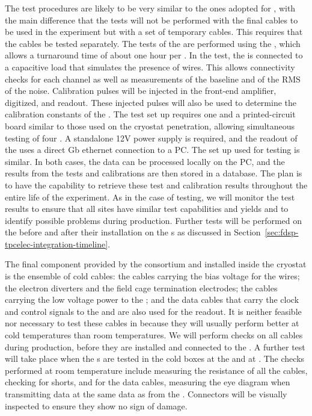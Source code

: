 The test procedures are likely to be
very similar to the ones adopted for , with the main
difference that the tests will not be performed with
the final cables to be used in the experiment but 
with a set of temporary cables. This requires that the 
cables be tested separately. The tests of the 
are performed using the , which allows a turnaround
time of about one hour per . In the
test, the  is connected to a capacitive load that
simulates the presence of  wires. This allows
connectivity checks for each channel as well as measurements of
the baseline and of the RMS  of the noise. Calibration 
pulses will be injected in the front-end amplifier, digitized,
and readout. These injected pulses will also be used
to determine the calibration constants of the . 
The test set up requires one  and
a printed-circuit board similar to those used on the cryostat
penetration, allowing simultaneous testing of four .
A standalone 12V power supply is required, and the readout
of the  uses a direct Gb ethernet connection to
a PC. The set up used for  testing is similar.
In both cases, the data can be processed locally on the PC,
and the results from the tests and calibrations are then stored 
in a database. The plan is to have the capability to retrieve  
these test and calibration results throughout the entire life
of the experiment. As in the case of  testing,
we will monitor the test results to ensure that all
sites have similar test capabilities and yields and to
identify possible problems during production.
Further tests will be performed on the 
before and after their installation on the s as
discussed in Section~\ref{sec:fdsp-tpcelec-integration-timeline}.

The final component provided by the  consortium
and installed inside the cryostat is the ensemble of cold
cables: the cables carrying the bias voltage for the 
wires; the electron diverters and the field cage termination electrodes;
the cables carrying the low voltage power to the ;
and the data cables that carry the clock and control signals
to the  and are also used for the readout. It is neither
feasible nor necessary to test these cables in \lntwo
because they will usually perform better at cold temperatures than 
room temperatures. We will perform checks on all cables 
during production, before they are installed and 
connected to the . A further test will take place
when the s are tested in the cold boxes at the 
and at . The checks performed at room temperature include
measuring the resistance of all the cables, checking for
shorts, and for the data cables, measuring the
eye diagram when transmitting data at the same data as from the
 . Connectors will be visually inspected 
to ensure they show no sign of damage.

